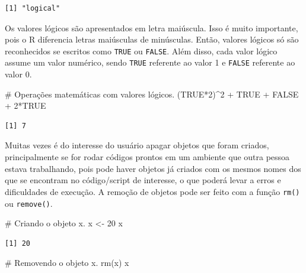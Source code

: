 \documentclass[
  letterpaper,
  DIV=11,
  numbers=noendperiod]{scrreprt}
\newenvironment{Shaded}{\begin{snugshade}}{\end{snugshade}}
\newcommand{\CommentTok}[1]{\textcolor[rgb]{0.37,0.37,0.37}{#1}}
\newcommand{\ConstantTok}[1]{\textcolor[rgb]{0.56,0.35,0.01}{#1}}
\newcommand{\DecValTok}[1]{\textcolor[rgb]{0.68,0.00,0.00}{#1}}
\newcommand{\FunctionTok}[1]{\textcolor[rgb]{0.28,0.35,0.67}{#1}}
\newcommand{\NormalTok}[1]{\textcolor[rgb]{0.00,0.23,0.31}{#1}}
\newcommand{\OtherTok}[1]{\textcolor[rgb]{0.00,0.23,0.31}{#1}}
\newcommand{\SpecialCharTok}[1]{\textcolor[rgb]{0.37,0.37,0.37}{#1}}
\begin{document}
\begin{verbatim}
[1] "logical"
\end{verbatim}

Os valores lógicos são apresentados em letra maiúscula. Isso é muito
importante, pois o R diferencia letras maiúsculas de minúsculas. Então,
valores lógicos só são reconhecidos se escritos como \texttt{TRUE} ou
\texttt{FALSE}. Além disso, cada valor lógico assume um valor numérico,
sendo \texttt{TRUE} referente ao valor 1 e \texttt{FALSE} referente ao
valor 0.

\begin{Shaded}
\begin{Highlighting}[]
\CommentTok{\# Operações matemáticas com valores lógicos.}
\NormalTok{(}\ConstantTok{TRUE}\SpecialCharTok{*}\DecValTok{2}\NormalTok{)}\SpecialCharTok{\^{}}\DecValTok{2} \SpecialCharTok{+} \ConstantTok{TRUE} \SpecialCharTok{+} \ConstantTok{FALSE} \SpecialCharTok{+} \DecValTok{2}\SpecialCharTok{*}\ConstantTok{TRUE}
\end{Highlighting}
\end{Shaded}

\begin{verbatim}
[1] 7
\end{verbatim}

Muitas vezes é do interesse do usuário apagar objetos que foram criados,
principalmente se for rodar códigos prontos em um ambiente que outra
pessoa estava trabalhando, pois pode haver objetos já criados com os
mesmos nomes dos que se encontram no código/script de interesse, o que
poderá levar a erros e dificuldades de execução. A remoção de objetos
pode ser feito com a função \texttt{rm()} ou \texttt{remove()}.

\begin{Shaded}
\begin{Highlighting}[]
\CommentTok{\# Criando o objeto x.}
\NormalTok{x }\OtherTok{\textless{}{-}} \DecValTok{20}
\NormalTok{x}
\end{Highlighting}
\end{Shaded}

\begin{verbatim}
[1] 20
\end{verbatim}

\begin{Shaded}
\begin{Highlighting}[]
\CommentTok{\# Removendo o objeto x.}
\FunctionTok{rm}\NormalTok{(x)}
\NormalTok{x}
\end{Highlighting}
\end{Shaded}
\end{document}
